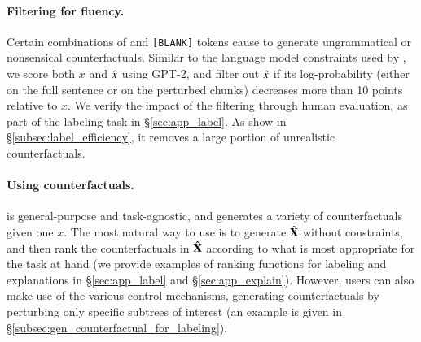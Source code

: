 \paragraph{Filtering for fluency.}
Certain combinations of \tagstrs and \texttt{[BLANK]} tokens cause \sysname to generate ungrammatical or nonsensical counterfactuals. 
Similar to the language model constraints used by \citet{morris2020textattack}, we score both $x$ and $\hat{x}$ using GPT-2, and filter out $\hat{x}$ if its log-probability (either on the full sentence or on the perturbed chunks) decreases more than 10 points relative to $x$.
We verify the impact of the filtering through human evaluation, as part of the labeling task in \S\ref{sec:app_label}.
As show in \S\ref{subsec:label_efficiency}, it removes a large portion of unrealistic counterfactuals.



\paragraph{Using counterfactuals.}
\sysname is general-purpose and task-agnostic, and generates a variety of counterfactuals given one $x$. The most natural way to use \sysname is to generate $\hat{\mathbf{X}}$ without constraints, and then rank the counterfactuals in  $\hat{\mathbf{X}}$ according to what is most appropriate for the task at hand (we provide examples of ranking functions for labeling and explanations in  \S\ref{sec:app_label} and \S\ref{sec:app_explain}). However, users can also make use of the various control mechanisms, \eg generating counterfactuals by perturbing only specific subtrees of interest (an example is given in \S\ref{subsec:gen_counterfactual_for_labeling}).






